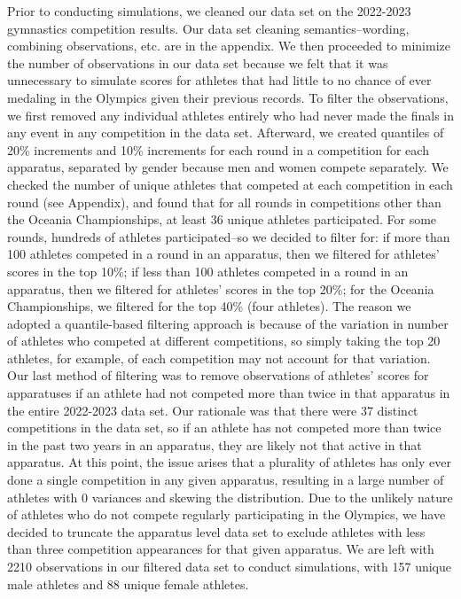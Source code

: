 \documentclass[
  10.5pt,
  letterpaper,
  DIV=11,
  numbers=noendperiod]{scrartcl}
\begin{document}
Prior to conducting simulations, we cleaned our data set on the
2022-2023 gymnastics competition results. Our data set cleaning
semantics--wording, combining observations, etc. are in the appendix. We
then proceeded to minimize the number of observations in our data set
because we felt that it was unnecessary to simulate scores for athletes
that had little to no chance of ever medaling in the Olympics given
their previous records. To filter the observations, we first removed any
individual athletes entirely who had never made the finals in any event
in any competition in the data set. Afterward, we created quantiles of
20\% increments and 10\% increments for each round in a competition for
each apparatus, separated by gender because men and women compete
separately. We checked the number of unique athletes that competed at
each competition in each round (see Appendix), and found that for all
rounds in competitions other than the Oceania Championships, at least 36
unique athletes participated. For some rounds, hundreds of athletes
participated--so we decided to filter for: if more than 100 athletes
competed in a round in an apparatus, then we filtered for athletes'
scores in the top 10\%; if less than 100 athletes competed in a round in
an apparatus, then we filtered for athletes' scores in the top 20\%; for
the Oceania Championships, we filtered for the top 40\% (four athletes).
The reason we adopted a quantile-based filtering approach is because of
the variation in number of athletes who competed at different
competitions, so simply taking the top 20 athletes, for example, of each
competition may not account for that variation. Our last method of
filtering was to remove observations of athletes' scores for apparatuses
if an athlete had not competed more than twice in that apparatus in the
entire 2022-2023 data set. Our rationale was that there were 37 distinct
competitions in the data set, so if an athlete has not competed more
than twice in the past two years in an apparatus, they are likely not
that active in that apparatus. At this point, the issue arises that a
plurality of athletes has only ever done a single competition in any
given apparatus, resulting in a large number of athletes with 0
variances and skewing the distribution. Due to the unlikely nature of
athletes who do not compete regularly participating in the Olympics, we
have decided to truncate the apparatus level data set to exclude
athletes with less than three competition appearances for that given
apparatus. We are left with 2210 observations in our filtered data set
to conduct simulations, with 157 unique male athletes and 88 unique
female athletes.
\end{document}
